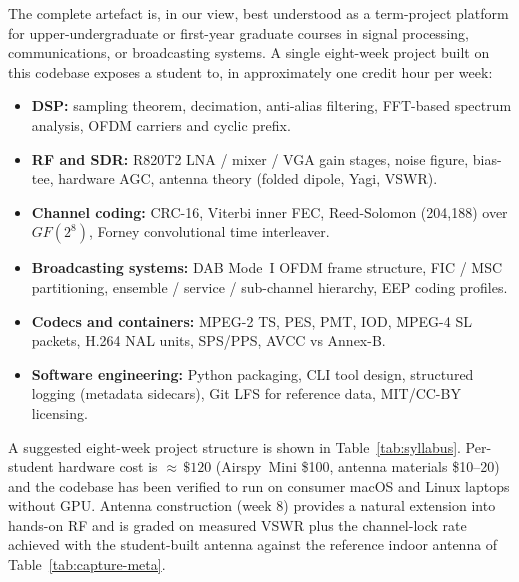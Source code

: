 \documentclass[11pt,a4paper]{article}
\begin{document}
The complete artefact is, in our view, best understood as a
term-project platform for upper-undergraduate or first-year
graduate courses in signal processing, communications, or
broadcasting systems.  A single eight-week project built on this
codebase exposes a student to, in approximately one credit hour
per week:

\begin{itemize}[leftmargin=*,nosep]
\item \textbf{DSP:} sampling theorem, decimation, anti-alias
      filtering, FFT-based spectrum analysis, OFDM carriers and
      cyclic prefix.
\item \textbf{RF and SDR:} R820T2 LNA / mixer / VGA gain stages,
      noise figure, bias-tee, hardware AGC, antenna theory
      (folded dipole, Yagi, VSWR).
\item \textbf{Channel coding:} CRC-16, Viterbi inner FEC,
      Reed-Solomon (204,188) over $GF(2^8)$, Forney convolutional
      time interleaver.
\item \textbf{Broadcasting systems:} DAB Mode~I OFDM frame
      structure, FIC / MSC partitioning, ensemble / service /
      sub-channel hierarchy, EEP coding profiles.
\item \textbf{Codecs and containers:} MPEG-2 TS, PES, PMT, IOD,
      MPEG-4 SL packets, H.264 NAL units, SPS/PPS, AVCC vs
      Annex-B.
\item \textbf{Software engineering:} Python packaging, CLI tool
      design, structured logging (metadata sidecars), Git LFS for
      reference data, MIT/CC-BY licensing.
\end{itemize}

A suggested eight-week project structure is shown in
Table~\ref{tab:syllabus}.  Per-student hardware cost is
$\approx\,\$120$ (Airspy~Mini \$100, antenna materials \$10--20)
and the codebase has been verified to run on consumer macOS and
Linux laptops without GPU.  Antenna construction (week 8)
provides a natural extension into hands-on RF and is graded on
measured VSWR plus the channel-lock rate achieved with the
student-built antenna against the reference indoor antenna of
Table~\ref{tab:capture-meta}.
\end{document}
